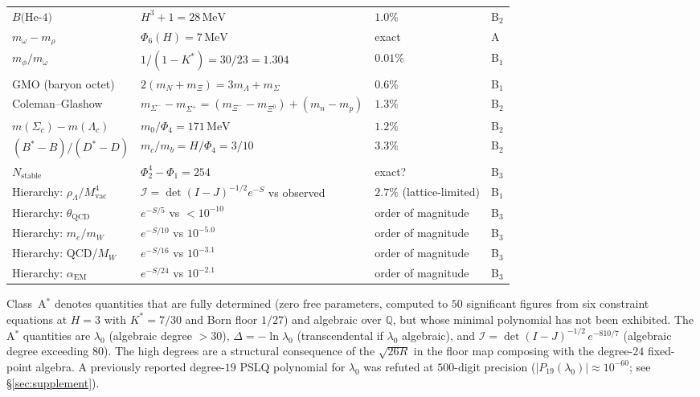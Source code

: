 \documentclass[11pt,a4paper]{article}
\theoremstyle{definition}
\theoremstyle{remark}
\begin{document}
\begin{longtable}{p{3.8cm}p{7.2cm}p{3.0cm}l}
$B(\mathrm{He}$-$4)$ & $H^3+1=28\,\mathrm{MeV}$ & $1.0\%$ & B$_2$ \\
$m_\omega-m_\rho$ & $\Phi_6(H)=7\,\mathrm{MeV}$ & exact & A \\
$m_\phi/m_\omega$ & $1/(1-K^*)=30/23=1.304$ & $0.01\%$ & B$_1$ \\
GMO (baryon octet) & $2(m_N+m_\Xi)=3m_\Lambda+m_\Sigma$ & $0.6\%$ & B$_1$ \\
Coleman--Glashow & $m_{\Sigma^-}-m_{\Sigma^+}=(m_{\Xi^-}-m_{\Xi^0})+(m_n-m_p)$ & $1.3\%$ & B$_2$ \\
$m(\Sigma_c)-m(\Lambda_c)$ & $m_0/\Phi_4 = 171\,\mathrm{MeV}$ & $1.2\%$ & B$_2$ \\
$(B^*\!-\!B)/(D^*\!-\!D)$ & $m_c/m_b=H/\Phi_4=3/10$ & $3.3\%$ & B$_2$ \\
$N_\mathrm{stable}$ & $\Phi_2^4-\Phi_1=254$ & exact? & B$_3$ \\
\midrule
Hierarchy: $\rho_\Lambda/M_{\mathrm{vac}}^4$ & $\mathcal{I}=\det(I\!-\!J)^{-1/2}e^{-S}$ vs observed & $2.7\%$ (lattice-limited) & B$_1$ \\
Hierarchy: $\theta_{\mathrm{QCD}}$ & $e^{-S/5}$ vs $< 10^{-10}$ & order of magnitude & B$_3$ \\
Hierarchy: $m_e/m_W$ & $e^{-S/10}$ vs $10^{-5.0}$ & order of magnitude & B$_3$ \\
Hierarchy: QCD/$M_W$ & $e^{-S/16}$ vs $10^{-3.1}$ & order of magnitude & B$_3$ \\
Hierarchy: $\alpha_{\mathrm{EM}}$ & $e^{-S/24}$ vs $10^{-2.1}$ & order of magnitude & B$_3$ \\
\end{longtable}

\bigskip

Class~A$^*$ denotes quantities that are fully determined (zero free parameters, computed to $50$ significant figures from six constraint equations at $H=3$ with $K^*=7/30$ and Born floor $1/27$) and algebraic over $\mathbb{Q}$, but whose minimal polynomial has not been exhibited. The A$^*$ quantities are $\lambda_0$ (algebraic degree $>30$), $\Delta=-\ln\lambda_0$ (transcendental if $\lambda_0$ algebraic), and $\mathcal{I}=\det(I-J)^{-1/2}\,e^{-810/7}$ (algebraic degree exceeding $80$). The high degrees are a structural consequence of the $\sqrt{26R}$ in the floor map composing with the degree-$24$ fixed-point algebra. A previously reported degree-$19$ PSLQ polynomial for $\lambda_0$ was refuted at $500$-digit precision ($|P_{19}(\lambda_0)|\approx 10^{-60}$; see \S\ref{sec:supplement}).
\end{document}
